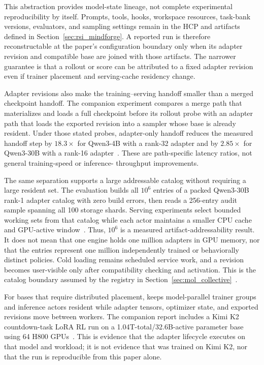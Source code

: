 This abstraction provides model-state lineage, not complete experimental
reproducibility by itself. Prompts, tools, hooks, workspace resources, task-bank
versions, evaluators, and sampling settings remain in the HCP and \mindforge{}
artifacts defined in Section~\ref{sec:rsi_mindforge}. A reported run is therefore
reconstructable at the paper's configuration boundary only when its adapter
revision and compatible base are joined with those artifacts. The narrower
\mint{} guarantee is that a rollout or score can be attributed to a fixed
adapter revision even if trainer placement and serving-cache residency change.

Adapter revisions also make the training--serving handoff smaller than a merged
checkpoint handoff. The companion \mint{} experiment compares a merge path that
materializes and loads a full checkpoint before its rollout probe with an
adapter path that loads the exported revision into a sampler whose base is
already resident. Under those stated probes, adapter-only handoff reduces the
measured handoff step by $18.3\times$ for Qwen3-4B with a rank-32 adapter and by
$2.85\times$ for Qwen3-30B with a rank-16 adapter~\citep{lu2026announcing}.
These are path-specific latency ratios, not general training-speed or inference-
throughput improvements.

The same separation supports a large addressable catalog without requiring a
large resident set. The \mint{} evaluation builds all $10^6$ entries of a packed
Qwen3-30B rank-1 adapter catalog with zero build errors, then reads a 256-entry
audit sample spanning all 100 storage shards. Serving experiments select bounded
working sets from that catalog while each actor maintains a smaller CPU cache
and GPU-active window~\citep{lu2026announcing}. Thus, $10^6$ is a measured
artifact-addressability result. It does not mean that one engine holds one
million adapters in GPU memory, nor that the entries represent one million
independently trained or behaviorally distinct policies. Cold loading remains
scheduled service work, and a revision becomes user-visible only after
compatibility checking and activation. This is the catalog boundary assumed by
the registry in Section~\ref{sec:mol_collective}~\citep{punica2024,slora2023}.

For bases that require distributed placement, \mint{} keeps model-parallel
trainer groups and inference actors resident while adapter tensors, optimizer
state, and exported revisions move between workers. The companion report
includes a Kimi K2 countdown-task LoRA RL run on a 1.04T-total/32.6B-active
parameter base using 64 H800 GPUs~\citep{lu2026announcing,kimi_k2_2025}. This is
evidence that the adapter lifecycle executes on that model and workload; it is
not evidence that \macaron{} was trained on Kimi K2, nor that the run is
reproducible from this paper alone.

